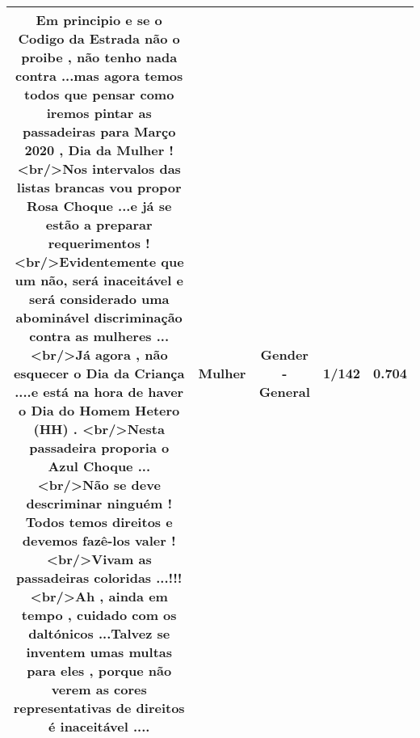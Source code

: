 \documentclass[11pt]{article}
\newlength\mylength
\begin{document}
\begin{center}
\begin{longtable}{|C{.65\mylength}|C{.30\mylength}|C{.12\mylength}|C{.12\mylength}|C{.12\mylength}|}
  \small Em principio e se o Codigo da Estrada não o proibe , não tenho nada contra ...mas agora temos todos  que pensar como iremos pintar as passadeiras para Março 2020 , Dia da \textbf{Mulher} !  <br/>Nos intervalos das listas brancas vou propor Rosa Choque ...e já se estão  a preparar requerimentos ! <br/>Evidentemente que um  não,   será  inaceitável e será considerado uma abominável discriminação contra as mulheres ...<br/>Já agora , não esquecer o Dia da Criança ....e está na hora de haver o Dia do Homem Hetero (HH) . <br/>Nesta passadeira proporia o Azul Choque ...<br/>Não se deve descriminar ninguém ! Todos temos direitos e devemos fazê-los valer ! <br/>Vivam as passadeiras coloridas ...!!!<br/>Ah , ainda em tempo , cuidado com os daltónicos ...Talvez se inventem umas multas para eles , porque não verem as cores representativas de direitos é inaceitável ....\normalsize   & Mulher & Gender - General & 1/142 & 0.704 \\  \hline
  
\end{longtable}
\end{center}
\end{document}
